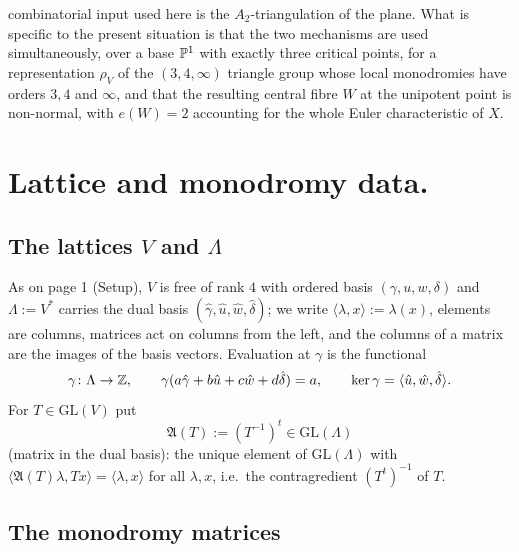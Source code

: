 \noindent combinatorial input used here is the $A_2$-triangulation of the plane. What is specific to the present situation is that the two mechanisms are used simultaneously, over a base $\mathbb{P}^1$ with exactly three critical points, for a representation $\rho_V$ of the $(3,4,\infty)$ triangle group whose local monodromies have orders $3,4$ and $\infty$, and that the resulting central fibre $W$ at the unipotent point is non-normal, with $e(W) = 2$ accounting for the whole Euler characteristic of $X$.

\section{Lattice and monodromy data.}

\subsection{The lattices $V$ and $\Lambda$}

As on page 1 (Setup), $V$ is free of rank $4$ with ordered basis $(\gamma,u,w,\delta)$ and $\Lambda := V^*$ carries the dual basis $(\hat\gamma,\hat u,\hat w,\hat\delta)$; we write $\langle \lambda, x\rangle := \lambda(x)$, elements are columns, matrices act on columns from the left, and the columns of a matrix are the images of the basis vectors. Evaluation at $\gamma$ is the functional
\[
\gamma \colon \Lambda \to \mathbb{Z}, \qquad \gamma(a\hat\gamma + b\hat u + c\hat w + d\hat\delta) = a, \qquad \ker\gamma = \langle \hat u,\hat w,\hat\delta\rangle.
\]
For $T \in \mathrm{GL}(V)$ put
\begin{equation}
\mathfrak A(T) := (T^{-1})^t \in \mathrm{GL}(\Lambda) \tag{2.1}
\end{equation}
(matrix in the dual basis): the unique element of $\mathrm{GL}(\Lambda)$ with $\langle \mathfrak A(T)\lambda, Tx\rangle = \langle \lambda,x\rangle$ for all $\lambda,x$, i.e.\ the contragredient $(T^t)^{-1}$ of $T$.

\subsection{The monodromy matrices}

